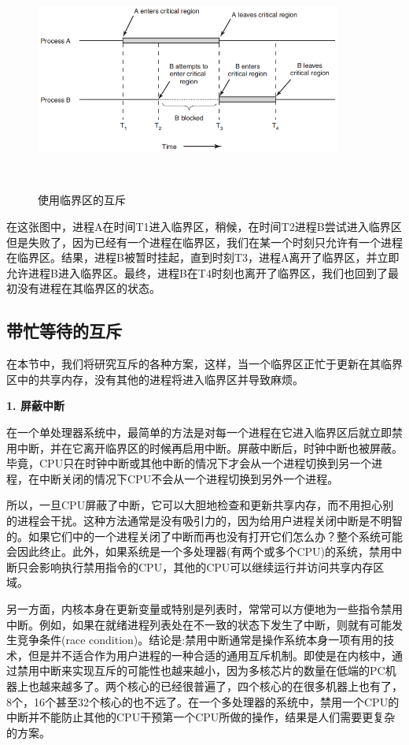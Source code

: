 	\begin{figure}[ht]\small
		\centering
		\includegraphics[width=0.90\textwidth]{FIG/2-22.png}
		\caption{使用临界区的互斥}　\label{fig:mutualexclusion}
	\end{figure}

	在这张图中，进程A在时间T1进入临界区，稍候，在时间T2进程B尝试进入临界区但是失败了，因为已经有一个进程在临界区，我们在某一个时刻只允许有一个进程在临界区。结果，进程B被暂时挂起，直到时刻T3，进程A离开了临界区，并立即允许进程B进入临界区。最终，进程B在T4时刻也离开了临界区，我们也回到了最初没有进程在其临界区的状态。
	
	\subsection{带忙等待的互斥}
	
	在本节中，我们将研究互斥的各种方案，这样，当一个临界区正忙于更新在其临界区中的共享内存，没有其他的进程将进入临界区并导致麻烦。
	
	\textbf{1. 屏蔽中断}
	
	在一个单处理器系统中，最简单的方法是对每一个进程在它进入临界区后就立即禁用中断，并在它离开临界区的时候再启用中断。屏蔽中断后，时钟中断也被屏蔽。毕竟，CPU只在时钟中断或其他中断的情况下才会从一个进程切换到另一个进程，在中断关闭的情况下CPU不会从一个进程切换到另外一个进程。
	
	所以，一旦CPU屏蔽了中断，它可以大胆地检查和更新共享内存，而不用担心别的进程会干扰。这种方法通常是没有吸引力的，因为给用户进程关闭中断是不明智的。如果它们中的一个进程关闭了中断而再也没有打开它们怎么办？整个系统可能会因此终止。此外，如果系统是一个多处理器(有两个或多个CPU)的系统，禁用中断只会影响执行禁用指令的CPU，其他的CPU可以继续运行并访问共享内存区域。
	
	另一方面，内核本身在更新变量或特别是列表时，常常可以方便地为一些指令禁用中断。例如，如果在就绪进程列表处在不一致的状态下发生了中断，则就有可能发生竞争条件(race condition)。结论是:禁用中断通常是操作系统本身一项有用的技术，但是并不适合作为用户进程的一种合适的通用互斥机制。即使是在内核中，通过禁用中断来实现互斥的可能性也越来越小，因为多核芯片的数量在低端的PC机器上也越来越多了。两个核心的已经很普遍了，四个核心的在很多机器上也有了，8个，16个甚至32个核心的也不远了。在一个多处理器的系统中，禁用一个CPU的中断并不能防止其他的CPU干预第一个CPU所做的操作，结果是人们需要更复杂的方案。
	
